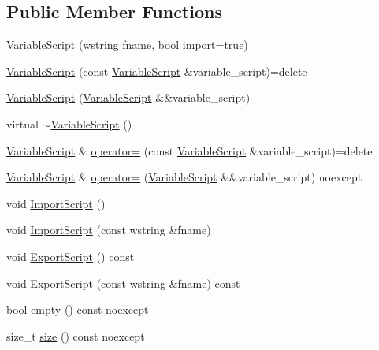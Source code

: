 \subsection*{Public Member Functions}
\begin{DoxyCompactItemize}
\item 
\hyperlink{classmage_1_1_variable_script_a87830f09a97aa8f7df3074029c5ab8d5}{Variable\+Script} (wstring fname, bool import=true)
\item 
\hyperlink{classmage_1_1_variable_script_aebd4e6cf2bdae4e57c9da428007fc4d7}{Variable\+Script} (const \hyperlink{classmage_1_1_variable_script}{Variable\+Script} \&variable\+\_\+script)=delete
\item 
\hyperlink{classmage_1_1_variable_script_acb767379c723255dd07ff2a541bc5f90}{Variable\+Script} (\hyperlink{classmage_1_1_variable_script}{Variable\+Script} \&\&variable\+\_\+script)
\item 
virtual \hyperlink{classmage_1_1_variable_script_ae7026e1283b1a1164f02fdc3e1f2b829}{$\sim$\+Variable\+Script} ()
\item 
\hyperlink{classmage_1_1_variable_script}{Variable\+Script} \& \hyperlink{classmage_1_1_variable_script_ae090b066ea939fc6611e77a47df6a97f}{operator=} (const \hyperlink{classmage_1_1_variable_script}{Variable\+Script} \&variable\+\_\+script)=delete
\item 
\hyperlink{classmage_1_1_variable_script}{Variable\+Script} \& \hyperlink{classmage_1_1_variable_script_a7cb6a585a701268aaac38d8f039fc403}{operator=} (\hyperlink{classmage_1_1_variable_script}{Variable\+Script} \&\&variable\+\_\+script) noexcept
\item 
void \hyperlink{classmage_1_1_variable_script_a5f1cc3bfb611edbc8dfb433ec55cc965}{Import\+Script} ()
\item 
void \hyperlink{classmage_1_1_variable_script_ae8bbfb30b5d47b5c66cd1b45bdd2cec5}{Import\+Script} (const wstring \&fname)
\item 
void \hyperlink{classmage_1_1_variable_script_ab12b7f789f6af2b301ff350fa401b324}{Export\+Script} () const
\item 
void \hyperlink{classmage_1_1_variable_script_a05ce2bcc72418422a443bcd8eff23486}{Export\+Script} (const wstring \&fname) const
\item 
bool \hyperlink{classmage_1_1_variable_script_a8a3f47783455cd6264dfc996887fd0f0}{empty} () const noexcept
\item 
size\+\_\+t \hyperlink{classmage_1_1_variable_script_a20e376c802dae71e001037afc316c795}{size} () const noexcept

\end{DoxyCompactItemize}
